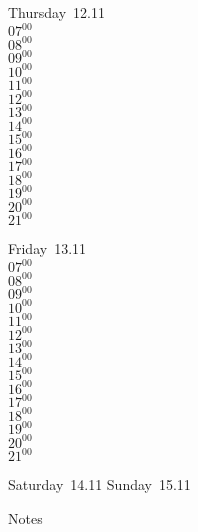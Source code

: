 \documentclass[11pt,a4paper]{book}\usepackage[]{graphicx}\usepackage[]{color}
\begin{document}
\clearpage
\begin{headerbox}
\end{headerbox}
\begin{weekdaybox}
  Thursday~12.11\\
  { 
  \vfill
  $07^{00}$\\
$08^{00}$\\
$09^{00}$\\
$10^{00}$\\
$11^{00}$\\
$12^{00}$\\
$13^{00}$\\
$14^{00}$\\
$15^{00}$\\
$16^{00}$\\
$17^{00}$\\
$18^{00}$\\
$19^{00}$\\
$20^{00}$\\
$21^{00}$\\
  }
\end{weekdaybox} 
\begin{weekdaybox}
  Friday~13.11\\
  { 
  \vfill
  $07^{00}$\\
$08^{00}$\\
$09^{00}$\\
$10^{00}$\\
$11^{00}$\\
$12^{00}$\\
$13^{00}$\\
$14^{00}$\\
$15^{00}$\\
$16^{00}$\\
$17^{00}$\\
$18^{00}$\\
$19^{00}$\\
$20^{00}$\\
$21^{00}$\\
  }
\end{weekdaybox}
\begin{weekendbox}
  Saturday~14.11
  \tcblower
  Sunday~15.11
\end{weekendbox} %
\begin{notebox}
  Notes
\end{notebox}
\clearpage
\end{document}
